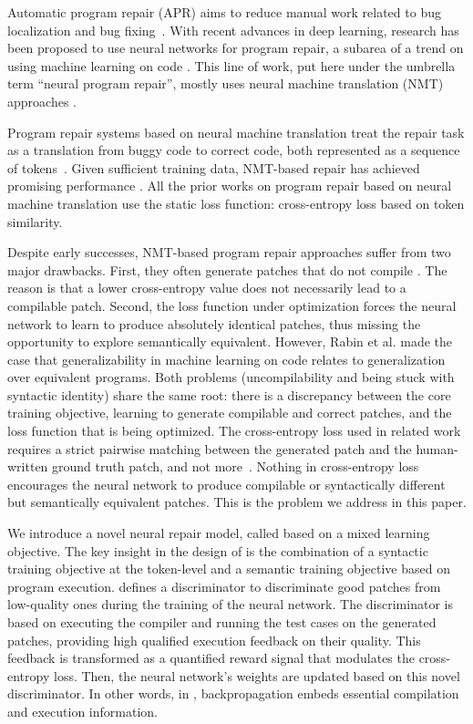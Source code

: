 Automatic program repair (APR) aims to reduce manual work related to bug localization and bug fixing~\cite{Monperrus2015,TSE-repair-survey}. With recent advances in deep learning, research has been proposed to use neural networks for program repair, a subarea of a trend on using machine learning on code \cite{machineonlearningoncodesurvey}. This line of work, put here under the umbrella term ``neural program repair'', mostly uses neural machine translation (NMT) approaches \cite{CURE-icse21,SEQUENCER,CoCoNuT,Tufano-ICSE19,codit-tse20,Tufano-tse19,deepfix}. 

Program repair systems based on neural machine translation treat the repair task as a translation from buggy code to correct code, both represented as a sequence of tokens~\cite{SEQUENCER}. 
Given sufficient training data, NMT-based repair has achieved promising
performance \cite{CURE-icse21,SEQUENCER,CoCoNuT,Tufano-ICSE19,codit-tse20,Tufano-tse19,deepfix}. 
All the prior works on program repair based on neural machine translation use the static loss function: cross-entropy loss based on token similarity. 

Despite early successes, NMT-based program repair approaches suffer from two major drawbacks.  First,
they often generate patches that do not compile \cite{SEQUENCER}. The reason is that a lower cross-entropy value does not necessarily lead to a compilable patch.
Second, the loss function under optimization forces the neural network to learn to produce absolutely identical patches, thus missing the opportunity to explore semantically equivalent.
However, Rabin et al. \cite{rabin2021generalizability} made the case that generalizability in machine learning on code relates to generalization over equivalent programs.
Both problems (uncompilability and being stuck with syntactic identity) share the same root: there is a discrepancy between the core training objective,  learning to generate compilable and correct patches, and the loss function that is being optimized.
The cross-entropy loss used in related work requires a strict pairwise matching between the generated patch and the human-written ground truth patch, and not more~\cite{NMT-bridging}. Nothing in cross-entropy loss encourages the neural network to produce compilable or syntactically different but semantically equivalent patches. 
This is the problem we address in this paper.

We introduce a novel neural repair model, called \approach based on a mixed learning objective. The key insight in the design of \approach is the combination of a syntactic training objective at the token-level and a semantic training objective based on program execution.  
\approach defines a discriminator to discriminate good patches from low-quality ones during the training of the neural network. The discriminator is based on executing the compiler and running the test cases on the generated patches, providing high qualified execution feedback on their quality. 
This feedback is transformed as a quantified reward signal that modulates the cross-entropy loss.
Then, the neural network's weights are updated based on this novel discriminator. In other words, in \approach, backpropagation embeds essential compilation and execution information. 

